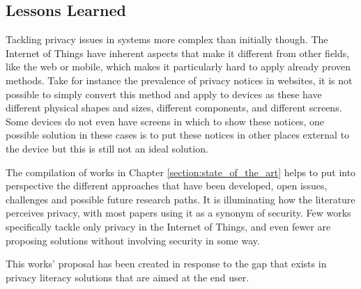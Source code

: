 \subsection{Lessons Learned}\label{subsection:lessons_learned}

Tackling privacy issues in \hyperlink{\acronym}{\acronym} systems more complex than initially though.
The Internet of Things have inherent aspects that make it different from
other fields, like the web or mobile, which makes it particularly hard
to apply already proven methods. Take for instance the prevalence of
privacy notices in websites, it is not possible to simply convert this
method and apply to \hyperlink{\acronym}{\acronym} devices as these have different physical shapes and sizes,
different components, and different screens. Some devices do not even have screens
in which to show these notices, one possible solution in these cases is to
put these notices in other places external to the device but this is still not
an ideal solution.

The compilation of works in Chapter \ref{section:state_of_the_art} helps
to put into perspective the different approaches that have been developed,
open issues, challenges and possible future research paths. It is illuminating
how the literature perceives privacy, with most papers using it as a synonym of security.
Few works specifically tackle only privacy in the Internet of Things, and even fewer
are proposing solutions without involving security in some way.

This works' proposal has been created in response to the gap that exists
in privacy literacy solutions that are aimed at the end user.
